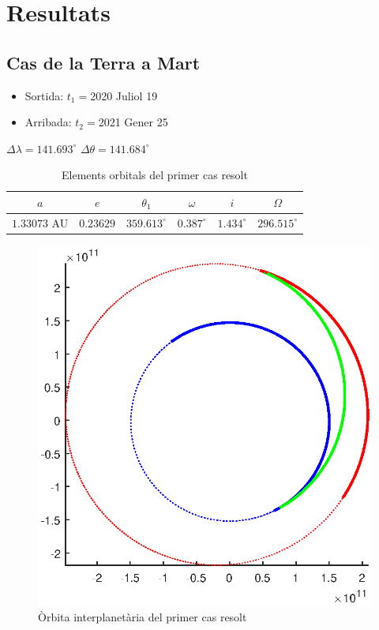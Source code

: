 \chapter{Resultats}

\section{Cas de la Terra a Mart}
\begin{itemize}
	\item Sortida: $t_{1}=$2020 Juliol 19
	\item Arribada: $t_{2}=$2021 Gener 25
\end{itemize}
$\Delta\lambda=141.693^{\circ}$
$\Delta\theta=141.684^{\circ}$
\begin{table}[h!]
	\centering
	\begin{tabular}{ |c|c|c|c|c|c|}
		\hline
		$a$ & $e$ & $\theta_{1}$ & $\omega$ & $i$ & $\Omega$ \\ \hline
		$1.33073$ AU  & $0.23629$ & $359.613^{\circ}$ & $0.387^{\circ}$ & $1.434^{\circ}$ & $296.515^{\circ}$ \\ \hline
	\end{tabular}
	\caption{Elements orbitals del primer cas resolt}
\end{table}
\begin{figure}[H]
	\centering
	\includegraphics[scale=0.8]{./plots/ex1}
	\caption{Òrbita interplanetària del primer cas resolt}
\end{figure}


